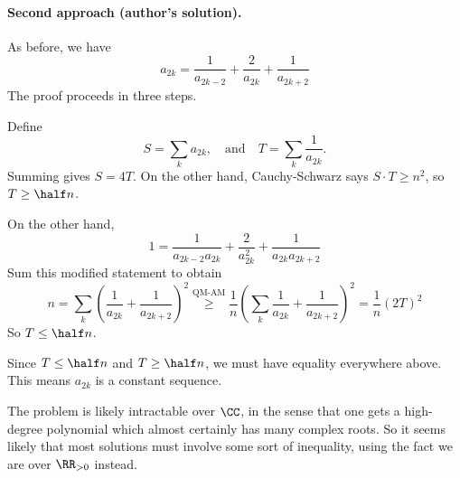 \documentclass[11pt]{scrartcl}
\begin{document}
\paragraph{Second approach (author's solution).}
As before, we have
\[ a_{2k} = \frac{1}{a_{2k-2}}
  + \frac{2}{a_{2k}} + \frac{1}{a_{2k+2}} \]
The proof proceeds in three steps.
\begin{itemize}
\ii Define
\[ S = \sum_k a_{2k},
  \quad\text{and}\quad
  T = \sum_k \frac{1}{a_{2k}}. \]
Summing gives $S = 4T$.
On the other hand, Cauchy-Schwarz says $S \cdot T \ge n^2$,
so $T \ge \half n$.

\ii On the other hand,
\[ 1 = \frac{1}{a_{2k-2} a_{2k}}
  + \frac{2}{a_{2k}^2} + \frac{1}{a_{2k} a_{2k+2}} \]
Sum this modified statement to obtain
\[
  n = \sum_k \left( \frac{1}{a_{2k}} + \frac{1}{a_{2k+2}} \right)^2
  \overset{\text{QM-AM}}{\ge}
  \frac 1n \left( \sum_k \frac{1}{a_{2k}} + \frac{1}{a_{2k+2}} \right)^2
  = \frac 1n \left( 2T \right)^2
\]
So $T \le \half n$.

\ii Since $T \le \half n$ and $T \ge \half n$,
we must have equality everywhere above.
This means $a_{2k}$ is a constant sequence.
\end{itemize}

\begin{remark*}
  The problem is likely intractable over $\CC$,
  in the sense that one gets a high-degree polynomial
  which almost certainly has many complex roots.
  So it seems likely that most solutions must involve
  some sort of inequality,
  using the fact we are over $\RR_{>0}$ instead.
\end{remark*}
\pagebreak
\end{document}
